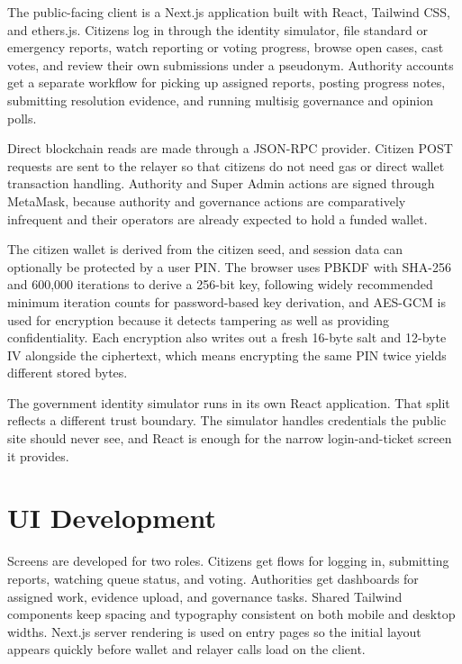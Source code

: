 The public-facing client is a Next.js application built with React, Tailwind CSS, and ethers.js. Citizens log in through the identity simulator, file standard or emergency reports, watch reporting or voting progress, browse open cases, cast votes, and review their own submissions under a pseudonym. Authority accounts get a separate workflow for picking up assigned reports, posting progress notes, submitting resolution evidence, and running multisig governance and opinion polls.

Direct blockchain reads are made through a JSON-RPC provider. Citizen POST requests are sent to the relayer so that citizens do not need gas or direct wallet transaction handling. Authority and Super Admin actions are signed through MetaMask, because authority and governance actions are comparatively infrequent and their operators are already expected to hold a funded wallet.

The citizen wallet is derived from the citizen seed, and session data can optionally be protected by a user PIN. The browser uses \ac{PBKDF} with SHA-256 and 600,000 iterations to derive a 256-bit key, following widely recommended minimum iteration counts for password-based key derivation, and \ac{AES}-\ac{GCM} is used for encryption because it detects tampering as well as providing confidentiality. Each encryption also writes out a fresh 16-byte salt and 12-byte IV alongside the ciphertext, which means encrypting the same PIN twice yields different stored bytes.

The government identity simulator runs in its own React application. That split reflects a different trust boundary. The simulator handles credentials the public site should never see, and React is enough for the narrow login-and-ticket screen it provides.

\section{\ac{UI} Development}
\label{sec:user-interface-development}

Screens are developed for two roles. Citizens get flows for logging in, submitting reports, watching queue status, and voting. Authorities get dashboards for assigned work, evidence upload, and governance tasks. Shared Tailwind components keep spacing and typography consistent on both mobile and desktop widths. Next.js server rendering is used on entry pages so the initial layout appears quickly before wallet and relayer calls load on the client.

